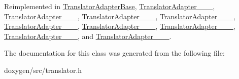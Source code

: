 Reimplemented in \mbox{\hyperlink{class_translator_adapter_base_acc5b89c39bae2a9bca490016ec15c79f}{Translator\+Adapter\+Base}}, \mbox{\hyperlink{class_translator_adapter__1__4__6_ab19b01d4e00c95ef1e6eb631fbe6ada4}{Translator\+Adapter\+\_\+\_\+\_}}, \mbox{\hyperlink{class_translator_adapter__1__5__4_a587a31dad925e47f206b6a0cda9eedd0}{Translator\+Adapter\+\_\+\_\+\_}}, \mbox{\hyperlink{class_translator_adapter__1__6__0_abc231eb2c1864ca9f878e7e5deb94f54}{Translator\+Adapter\+\_\+\_\+\_}}, \mbox{\hyperlink{class_translator_adapter__1__6__3_ab3d79abfb926c41bd7609eeb706654fe}{Translator\+Adapter\+\_\+\_\+\_}}, \mbox{\hyperlink{class_translator_adapter__1__7__5_a6e69d48e79a13c9d934f9af1a8befd8a}{Translator\+Adapter\+\_\+\_\+\_}}, \mbox{\hyperlink{class_translator_adapter__1__8__0_a47cedb130d9a178d9c632584d4f2abec}{Translator\+Adapter\+\_\+\_\+\_}}, \mbox{\hyperlink{class_translator_adapter__1__8__2_a307747456f69ab8dcb0c2be27f429e80}{Translator\+Adapter\+\_\+\_\+\_}}, \mbox{\hyperlink{class_translator_adapter__1__8__4_a87dbcf9a99bf2ddfd9593461d331b714}{Translator\+Adapter\+\_\+\_\+\_}}, and \mbox{\hyperlink{class_translator_adapter__1__8__15_a80d2ab2af345124fee8267ad82ac51ed}{Translator\+Adapter\+\_\+\_\+\_}}.



The documentation for this class was generated from the following file\+:\begin{DoxyCompactItemize}
\item 
doxygen/src/translator.\+h\end{DoxyCompactItemize}
